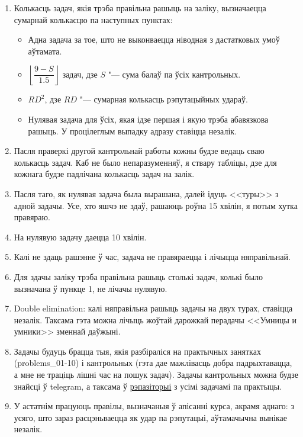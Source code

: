 \documentclass[12pt, a4paper]{extarticle}
\begin{document}
    \begin{enumerate}
        \item Колькасць задач, якія трэба правільна рашыць на заліку, вызначаецца сумарнай колькасцю па наступных пунктах:
        \begin{itemize}
            \item Адна задача за тое, што не выконваецца ніводная з дастатковых умоў аўтамата.
            \item $\left\lfloor \dfrac{9 - S}{1.5} \right\rfloor$ задач, дзе $S$ "--- сума балаў па ўсіх кантрольных.
            \item $RD^2$, дзе $RD$ "--- сумарная колькасць рэпутацыйных удараў.
            \item Нулявая задача для ўсіх, якая ідзе першая і якую трэба абавязкова рашыць. У процілеглым выпадку адразу ставіцца незалік.
        \end{itemize}
        \item Пасля праверкі другой кантрольнай работы кожны будзе ведаць сваю колькасць задач. Каб не было непаразуменняў, я ствару табліцы, дзе для кожнага будзе падлічана колькасць задач на залік.
        \item Пасля таго, як нулявая задача была вырашана, далей ідуць <<туры>> з адной задачы. Усе, хто яшчэ не здаў, рашаюць роўна 15 хвілін, я потым хутка правяраю. 
        \item На нулявую задачу даецца 10 хвілін.
        \item Калі не здаць рашэнне ў час, задача не правяраецца і лічыцца няправільнай. 
        \item Для здачы заліку трэба правільна рашыць столькі задач, колькі было вызначана ў пункце 1, не лічачы нулявую.
        \item Double elimination: калі няправільна рашыць задачы на двух турах, ставіцца незалік. Таксама гэта можна лічыць жоўтай дарожкай перадачы <<Умницы и умники>> зменнай даўжыні.
        \item Задачы будуць брацца тыя, якія разбіраліся на практычных занятках (problems\_01-10) і кантрольных (гэта дае мажлівасць добра падрыхтавацца, а мне не траціць лішні час на пошук задач). Задачы кантрольных можна будзе знайсці ў telegram, а таксама ў \href{https://github.com/bsu-docs/discrete-mathematics-problems}{рэпазіторыі} з усімі задачамі па практыцы.
        \item У астатнім працуюць правілы, вызначаныя ў апісанні курса, акрамя аднаго: з усяго, што зараз расцэньваецца як удар па рэпутацыі, аўтамачычна вынікае незалік.
    \end{enumerate}
\end{document}
